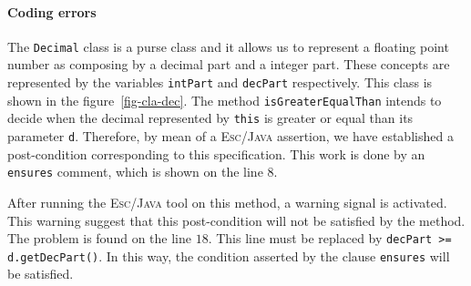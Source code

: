 \documentclass[a4paper]{llncs}
\begin{document}
\paragraph{Coding errors}
The \texttt{Decimal} class is a purse class and it allows us to
represent a floating point number as
composing by a decimal part and a integer part. These concepts are
represented by the variables \texttt{intPart} and \texttt{decPart}
respectively. This class is shown in the figure~\ref{fig-cla-dec}. The
method \texttt{isGreaterEqualThan} intends to decide when the decimal
represented by \texttt{this} is greater or equal than its parameter
\texttt{d}. Therefore, by mean of a \textsc{Esc/Java} assertion, we
have established a post-condition corresponding to this
specification. This work is done by an \texttt{ensures} comment, which
is shown on the line $8$. 

After running the \textsc{Esc/Java} tool on this method, a warning
signal is activated. This warning suggest that this post-condition
will not be satisfied by the method. The problem is found on the line
$18$. This line must be replaced by \texttt{decPart >=
d.getDecPart()}. In this way, the condition asserted by the clause
\texttt{ensures} will be satisfied.
\end{document}
